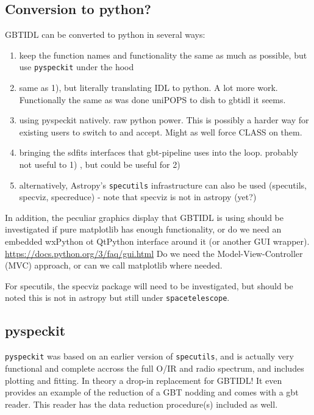 \documentclass[12pt,a4paper]{article}
\begin{document}
\subsection{Conversion to python?}

GBTIDL can be converted to python in several ways:

\begin{enumerate}
\item
  keep the function names and functionality the same as much as possible,
    but use {\tt pyspeckit} under the hood

\item
  same as 1), but literally  translating IDL to python. A lot more work.
  Functionally the same as  was done uniPOPS to dish to gbtidl it seems.

\item
  using pyspeckit natively. raw python power. This is possibly a harder way for
  existing users to switch to and accept. Might as well force CLASS on them.
  
\item
  bringing the sdfits interfaces that gbt-pipeline uses into the loop.
  probably not useful to 1) , but could be useful for 2)

\item
  alternatively, Astropy's {\tt specutils} infrastructure can also be used
  (specutils, specviz, specreduce) - note that specviz is not in astropy (yet?)

\end{enumerate}

In addition, the peculiar graphics display that GBTIDL is using should
be investigated if pure matplotlib has enough functionality, or do we
need an embedded wxPython ot QtPython interface around it (or another
GUI wrapper).  \url{https://docs.python.org/3/faq/gui.html}
Do we need the Model-View-Controller (MVC) approach, or can we call
matplotlib where needed.

For specutils, the specviz package will need to be investigated, but
should be noted this is not in astropy but still under
{\tt spacetelescope}.

\subsection{pyspeckit}

{\tt pyspeckit} was based on an earlier version of {\tt specutils},
and is actually very functional and complete accross the full
O/IR and radio spectrum, and includes plotting and fitting. In theory
a drop-in replacement for GBTIDL! It even provides an example of the reduction
of a GBT nodding and comes with a gbt reader. This reader has the
data reduction procedure(s) included as well.
\end{document}
